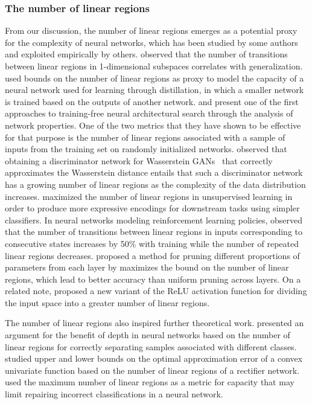 \subsubsection{The number of linear regions}

From our discussion, the number of linear regions emerges as a potential proxy for the complexity of neural networks, 
which has been studied by some authors and exploited empirically by others. 
\cite{novak2018sensitivity} observed that the number of transitions between linear regions in 1-dimensional subspaces correlates with generalization. 
\cite{hu2020distillation} used bounds on the number of linear regions as proxy to model the capacity of a neural network used for learning through distillation, in which a smaller network is trained based on the outputs of another network. 
\cite{chen2021nas} and \cite{chen2021nas2} present one of the first approaches to training-free neural architectural search through the analysis of network properties. One of the two metrics that they have shown to be effective for that purpose is the number of linear regions associated with a sample of inputs from the training set on randomly initialized networks. 
\cite{biau2021wgans} observed that obtaining a discriminator network for Wasserstein GANs~\citep{arjovsky2017wgan} that correctly approximates the Wasserstein distance entails that such a discriminator network has a growing number of linear regions as the complexity of the data distribution increases. 
\cite{park2021unsupervised} maximized the number of linear regions in unsupervised learning in order to produce more expressive encodings for downstream tasks using simpler classifiers. 
In neural networks modeling reinforcement learning policies, 
\cite{cohan2022evolution} observed that the number of transitions between linear regions in inputs corresponding to consecutive states increases by 50\% with training while the number of repeated linear regions decreases. 
\cite{cai2023pruning} proposed a method for pruning different proportions of parameters from each layer by maximizes the bound on the number of linear regions, 
which lead to better accuracy than uniform pruning across layers. 
On a related note, 
\cite{liang2021brelu} proposed a new variant of the ReLU activation function for dividing the input space into a greater number of linear regions. 

The number of linear regions also inspired further theoretical work. 
\cite{amrami2021benefit} presented an argument for the benefit of depth in neural networks based on the number of linear regions for correctly separating samples associated with different classes. 
\cite{liu2021approximation} studied upper and lower bounds on the optimal approximation error of a convex univariate function based on the number of linear regions of a rectifier network. 
\cite{henriksen2022repairing} used the maximum number of linear regions as a metric for capacity that may limit repairing incorrect classifications in a neural network. 


